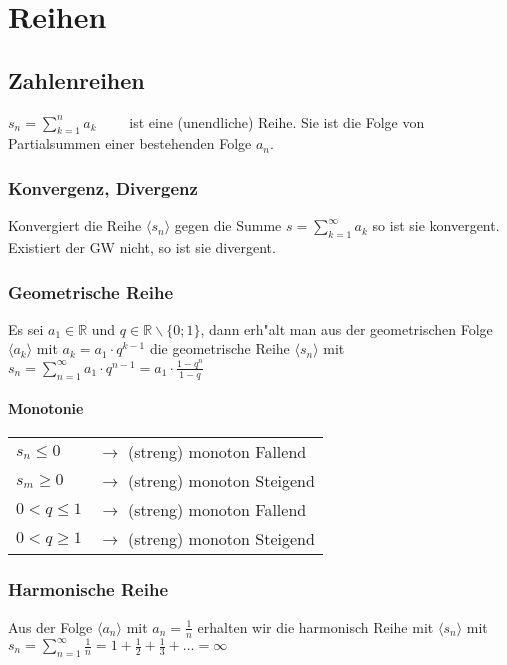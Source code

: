 \section{Reihen}

\subsection{Zahlenreihen}
  $ s_n = \sum\limits_{k=1}^{n} a_k \qquad $ ist eine (unendliche) Reihe. Sie
  ist die Folge von Partialsummen einer bestehenden Folge $a_n$.

\subsubsection{Konvergenz, Divergenz}
Konvergiert die Reihe $\langle s_n \rangle$ gegen die Summe $ s =
\sum\limits_{k=1}^{\infty} a_k $ so ist sie konvergent. Existiert der GW nicht, so ist sie divergent.

\subsubsection{Geometrische Reihe}
Es sei $a_1\in\mathbb R$ und $q\in\mathbb R \backslash \{0;1\}$, dann erh"alt
man aus der geometrischen Folge $\langle a_k \rangle$ mit $a_k=a_1 \cdot
q^{k-1}$ die geometrische Reihe $\langle s_n \rangle$ mit
\textbf{$s_n= \sum\limits_{n=1}^{\infty} a_1 \cdot q^{n-1}=a_1 \cdot
\frac{1-q^n}{1-q}$\\}
\paragraph{Monotonie}
\begin{tabular}{ll}
$s_n \leq 0$&$\to$ (streng) monoton Fallend\\
$s_m \geq 0$&$\to$ (streng) monoton Steigend\\
$0 < q \leq 1$&$\to$ (streng) monoton Fallend\\
$0 < q \geq 1$&$\to$ (streng) monoton Steigend\\
\end{tabular}

\subsubsection{Harmonische Reihe}
Aus der Folge $\langle a_n \rangle$ mit $a_n=\frac{1}{n}$ erhalten wir die
harmonisch Reihe mit $\langle s_n \rangle$ mit
\textbf{$s_n=\sum\limits_{n=1}^{\infty}
\frac{1}{n}=1+\frac{1}{2}+\frac{1}{3}+\dotsc = \infty$}

